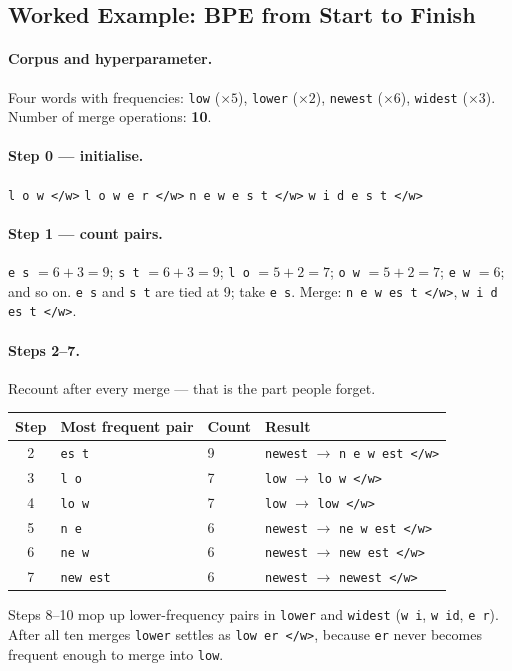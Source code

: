 \documentclass[11pt,a4paper]{article}
\begin{document}
\subsection{Worked Example: BPE from Start to Finish}

\paragraph{Corpus and hyperparameter.} Four words with frequencies: \texttt{low} ($\times5$),
\texttt{lower} ($\times2$), \texttt{newest} ($\times6$), \texttt{widest} ($\times3$). Number
of merge operations: \textbf{10}.

\paragraph{Step 0 --- initialise.}
\texttt{l o w </w>} \quad \texttt{l o w e r </w>} \quad \texttt{n e w e s t </w>} \quad
\texttt{w i d e s t </w>}

\paragraph{Step 1 --- count pairs.} \texttt{e s} $= 6+3 = 9$; \texttt{s t} $= 6+3 = 9$;
\texttt{l o} $= 5+2 = 7$; \texttt{o w} $= 5+2 = 7$; \texttt{e w} $= 6$; and so on.
\texttt{e s} and \texttt{s t} are tied at 9; take \texttt{e s}. Merge:
\texttt{n e w es t </w>}, \texttt{w i d es t </w>}.

\paragraph{Steps 2--7.} Recount after every merge --- that is the part people forget.
\begin{center}
\begin{tabular}{clll}
\textbf{Step} & \textbf{Most frequent pair} & \textbf{Count} & \textbf{Result} \\
\hline
2 & \texttt{es t} & 9 & \texttt{newest} $\rightarrow$ \texttt{n e w est </w>} \\
3 & \texttt{l o} & 7 & \texttt{low} $\rightarrow$ \texttt{lo w </w>} \\
4 & \texttt{lo w} & 7 & \texttt{low} $\rightarrow$ \texttt{low </w>} \\
5 & \texttt{n e} & 6 & \texttt{newest} $\rightarrow$ \texttt{ne w est </w>} \\
6 & \texttt{ne w} & 6 & \texttt{newest} $\rightarrow$ \texttt{new est </w>} \\
7 & \texttt{new est} & 6 & \texttt{newest} $\rightarrow$ \texttt{newest </w>} \\
\end{tabular}
\end{center}
Steps 8--10 mop up lower-frequency pairs in \texttt{lower} and \texttt{widest}
(\texttt{w i}, \texttt{w id}, \texttt{e r}). After all ten merges \texttt{lower} settles as
\texttt{low er </w>}, because \texttt{er} never becomes frequent enough to merge into
\texttt{low}.
\end{document}
